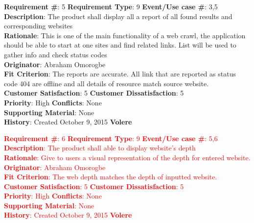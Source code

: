 \documentclass[titlepage]{article}
\begin{document}
\begin{framed}
\textbf{Requirement \#}: 5 \hfill \textbf{Requirement Type}: 9 \hfill\textbf{Event/Use case \#}: 3,5 \hfill\\
\textbf{Description}:  The product shall display all a report of all found results and corresponding websites\\
\textbf{Rationale}: This is one of the main functionality of a web crawl, the application should be able to start at one sites and find related links. List will be used to gather info and check status codes	\\
\textbf{Originator}: Abraham Omorogbe\\
\textbf{Fit Criterion}: The reports are accurate. All link that are reported as status code 404 are offline and all details of resource match source website.\\
\textbf{Customer Satisfaction}: 5 \hfill 	\textbf{Customer Dissatisfaction}: 5 \hfill\\
\textbf{Priority}: High \hfill \textbf{Conflicts}: None \hfill 		\\
\textbf{Supporting Material}: None\\
\textbf{History}: Created October 9, 2015 \hfill	 \textbf{Volere}\hfill

\end{framed}

\begin{framed}
\textcolor{red}{
\textbf{Requirement \#}: 6 \hfill \textbf{Requirement Type}: 9 \hfill\textbf{Event/Use case \#}: 5,6 \hfill\\
\textbf{Description}:  The product shall able to display website’s depth\\
\textbf{Rationale}: Give to users a visual representation of the depth for entered website.\\
\textbf{Originator}: Abraham Omorogbe\\
\textbf{Fit Criterion}: The web depth matches the depth of inputted website.	\\
\textbf{Customer Satisfaction}: 5 \hfill 	\textbf{Customer Dissatisfaction}: 5 \hfill\\
\textbf{Priority}: High \hfill \textbf{Conflicts}: None \hfill 		\\
\textbf{Supporting Material}: None\\
\textbf{History}: Created October 9, 2015 \hfill	 \textbf{Volere}\hfill}

\end{framed}
\end{document}
